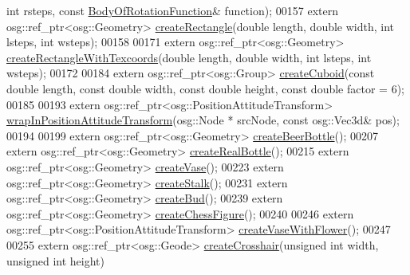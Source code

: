 \begin{DoxyCode}
{      int} rsteps, \textcolor{keyword}{const} \hyperlink{structbrtr_1_1_body_of_rotation_function}{BodyOfRotationFunction}& \textcolor{keyword}{function});
00157     \textcolor{keyword}{extern} osg::ref\_ptr<osg::Geometry> \hyperlink{namespacebrtr_a793c6ef7f57632fc5ac280b94f60dd65}{createRectangle}(\textcolor{keywordtype}{double} length, \textcolor{keywordtype}{double} width, \textcolor{keywordtype}{int} 
      lsteps, \textcolor{keywordtype}{int} wsteps);
00158 
00171     \textcolor{keyword}{extern} osg::ref\_ptr<osg::Geometry> \hyperlink{namespacebrtr_a4e91424e74398a612c38a920df0577ef}{createRectangleWithTexcoords}(\textcolor{keywordtype}{double} 
      length, \textcolor{keywordtype}{double} width, \textcolor{keywordtype}{int} lsteps, \textcolor{keywordtype}{int} wsteps);
00172 
00184     \textcolor{keyword}{extern} osg::ref\_ptr<osg::Group> \hyperlink{namespacebrtr_ae7f155c263aec9663a02763ed0bb882b}{createCuboid}(\textcolor{keyword}{const} \textcolor{keywordtype}{double} length, \textcolor{keyword}{const} \textcolor{keywordtype}{double} width, \textcolor{keyword}{const}
       \textcolor{keywordtype}{double} height, \textcolor{keyword}{const} \textcolor{keywordtype}{double} factor = 6);
00185     
00193     \textcolor{keyword}{extern} osg::ref\_ptr<osg::PositionAttitudeTransform> 
      \hyperlink{namespacebrtr_a887d7975f37c4334b70e2196735b6678}{wrapInPositionAttitudeTransform}(osg::Node * srcNode, \textcolor{keyword}{const} osg::Vec3d& pos);
00194 
00199     \textcolor{keyword}{extern} osg::ref\_ptr<osg::Geometry> \hyperlink{namespacebrtr_a16fa8982307a039c08ab56912bab94b9}{createBeerBottle}();
00207     \textcolor{keyword}{extern} osg::ref\_ptr<osg::Geometry> \hyperlink{namespacebrtr_a614d8d6b8bcc6c4e7f7ffb24ca48eb4c}{createRealBottle}();
00215     \textcolor{keyword}{extern} osg::ref\_ptr<osg::Geometry> \hyperlink{namespacebrtr_ab4f3c063f7a8fa6cc33a8cb52b036d27}{createVase}();
00223     \textcolor{keyword}{extern}  osg::ref\_ptr<osg::Geometry> \hyperlink{namespacebrtr_a4ccd9746e37278e47832da270dc00fb3}{createStalk}();
00231     \textcolor{keyword}{extern}  osg::ref\_ptr<osg::Geometry> \hyperlink{namespacebrtr_a51b3741c30ca1b6282b9693055ddc060}{createBud}();
00239     \textcolor{keyword}{extern} osg::ref\_ptr<osg::Geometry> \hyperlink{namespacebrtr_a118d4013732dea1a161b6d225df6dc2e}{createChessFigure}();
00240 
00246     \textcolor{keyword}{extern} osg::ref\_ptr<osg::PositionAttitudeTransform> \hyperlink{namespacebrtr_a05625aff9337331ae351d283f79f0f1e}{createVaseWithFlower}();
00247 
00255     \textcolor{keyword}{extern} osg::ref\_ptr<osg::Geode> \hyperlink{namespacebrtr_a31c533ae635c528c761cc83e34e91b2f}{createCrosshair}(\textcolor{keywordtype}{unsigned} \textcolor{keywordtype}{int} width, \textcolor{keywordtype}{unsigned} \textcolor{keywordtype}{int} height)

\end{DoxyCode}
